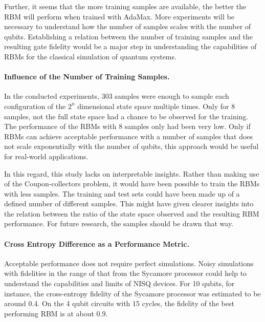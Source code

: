 Further, it seems that the more training samples are available, the better the RBM will 
perform when trained with AdaMax. More experiments will be necessary 
to understand how the number of samples scales with the number of qubits. Establishing
a relation between the number of training samples and the resulting gate fidelity would 
be a major step in understanding the capabilities of RBMs for the classical simulation of 
quantum systems.

\paragraph{Influence of the Number of Training Samples.}
In the conducted experiments, 303 samples were enough to sample each configuration of the 
$2^n$ dimensional state space multiple times. Only for 8  samples, not the full state space
had a chance to be observed for the training. The performance of the RBMs with 8 samples only 
had been very low. Only if RBMs can achieve acceptable performance with a number of samples 
that does not scale exponentially with the number of qubits, this approach would be useful for 
real-world applications. 

In this regard, this study lacks on interpretable insights. Rather than making use of the 
Coupon-collectors problem, it would have been possible to train the RBMs with less samples. 
The training and test sets could have been made up of a defined number of different 
samples. This might have given clearer insights into the relation between the ratio of the 
state space observed and the resulting RBM performance. For future research, the samples should
be drawn that way.

\paragraph{Cross Entropy Difference as a Performance Metric.}
Acceptable performance does not require perfect simulations. Noisy simulations with 
fidelities in the range of that from the Sycamore processor could help to understand the 
capabilities and limits of NISQ devices. For 10 qubits, for instance, the cross-entropy fidelity
of the Sycamore processor was estimated to be around 0.4. On the 4 qubit circuits with 
15 cycles, the fidelity of the best performing RBM is at about 0.9.

